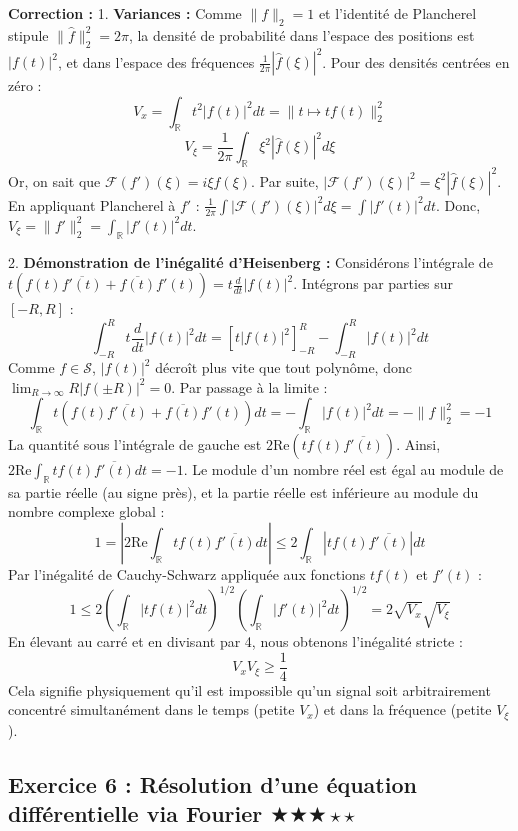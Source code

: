 \documentclass[11pt,a4paper]{article}
\begin{document}
\textbf{Correction :}
1. \textbf{Variances :}
Comme $\|f\|_2 = 1$ et l'identité de Plancherel stipule $\|\hat{f}\|_2^2 = 2\pi$, la densité de probabilité dans l'espace des positions est $|f(t)|^2$, et dans l'espace des fréquences $\frac{1}{2\pi} |\hat{f}(\xi)|^2$.
Pour des densités centrées en zéro :
$$ V_x = \int_{\mathbb{R}} t^2 |f(t)|^2 dt = \| t \mapsto t f(t) \|_2^2 $$
$$ V_\xi = \frac{1}{2\pi} \int_{\mathbb{R}} \xi^2 |\hat{f}(\xi)|^2 d\xi $$
Or, on sait que $\mathcal{F}(f')(\xi) = i\xi \hat{f}(\xi)$. Par suite, $|\mathcal{F}(f')(\xi)|^2 = \xi^2 |\hat{f}(\xi)|^2$.
En appliquant Plancherel à $f'$ : $\frac{1}{2\pi} \int |\mathcal{F}(f')(\xi)|^2 d\xi = \int |f'(t)|^2 dt$.
Donc, $V_\xi = \|f'\|_2^2 = \int_{\mathbb{R}} |f'(t)|^2 dt$.

2. \textbf{Démonstration de l'inégalité d'Heisenberg :}
Considérons l'intégrale de $t (f(t) \overline{f'(t)} + \overline{f(t)} f'(t)) = t \frac{d}{dt} |f(t)|^2$.
Intégrons par parties sur $[-R, R]$ :
$$ \int_{-R}^{R} t \frac{d}{dt} |f(t)|^2 dt = \left[ t |f(t)|^2 \right]_{-R}^{R} - \int_{-R}^{R} |f(t)|^2 dt $$
Comme $f \in \mathcal{S}$, $|f(t)|^2$ décroît plus vite que tout polynôme, donc $\lim_{R \to \infty} R|f(\pm R)|^2 = 0$.
Par passage à la limite :
$$ \int_{\mathbb{R}} t (f(t) \overline{f'(t)} + \overline{f(t)} f'(t)) dt = - \int_{\mathbb{R}} |f(t)|^2 dt = - \|f\|_2^2 = -1 $$
La quantité sous l'intégrale de gauche est $2 \text{Re}(t f(t) \overline{f'(t)})$.
Ainsi, $2 \text{Re} \int_{\mathbb{R}} t f(t) \overline{f'(t)} dt = -1$.
Le module d'un nombre réel est égal au module de sa partie réelle (au signe près), et la partie réelle est inférieure au module du nombre complexe global :
$$ 1 = \left| 2 \text{Re} \int_{\mathbb{R}} t f(t) \overline{f'(t)} dt \right| \le 2 \int_{\mathbb{R}} |t f(t) \overline{f'(t)}| dt $$
Par l'inégalité de Cauchy-Schwarz appliquée aux fonctions $t f(t)$ et $f'(t)$ :
$$ 1 \le 2 \left( \int_{\mathbb{R}} |t f(t)|^2 dt \right)^{1/2} \left( \int_{\mathbb{R}} |f'(t)|^2 dt \right)^{1/2} = 2 \sqrt{V_x} \sqrt{V_\xi} $$
En élevant au carré et en divisant par 4, nous obtenons l'inégalité stricte :
$$ V_x V_\xi \ge \frac{1}{4} $$
Cela signifie physiquement qu'il est impossible qu'un signal soit arbitrairement concentré simultanément dans le temps (petite $V_x$) et dans la fréquence (petite $V_\xi$).



\subsection*{Exercice 6 : Résolution d'une équation différentielle via Fourier \quad $\bigstar\bigstar\bigstar\star\star$}
\end{document}
